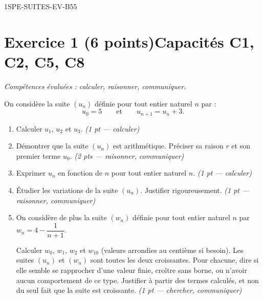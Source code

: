 
\begin{evaluation}{1SPE-SUITES-EV-B}{55}

\section*{Exercice 1 \ifnxVersionProfesseur\hfill (6 points)\fi \hfill Capacités C1, C2, C5, C8}

\textit{Compétences évaluées : calculer, raisonner, communiquer.}

\medskip
On considère la suite $(u_n)$ définie pour tout entier naturel $n$ par :
\[
  u_0 = 5 \qquad \text{et} \qquad u_{n+1} = u_n + 3.
\]

\begin{enumerate}
  \item Calculer $u_1$, $u_2$ et $u_3$.
  \ifnxVersionProfesseur\hfill\textit{(1 pt — calculer)}\fi

  \item Démontrer que la suite $(u_n)$ est arithmétique. Préciser sa raison $r$ et son premier terme $u_0$.
  \ifnxVersionProfesseur\hfill\textit{(2 pts — raisonner, communiquer)}\fi

  \item Exprimer $u_n$ en fonction de $n$ pour tout entier naturel $n$.
  \ifnxVersionProfesseur\hfill\textit{(1 pt — calculer)}\fi

  \item Étudier les variations de la suite $(u_n)$. Justifier rigoureusement.
  \ifnxVersionProfesseur\hfill\textit{(1 pt — raisonner, communiquer)}\fi

  \item On considère de plus la suite $(w_n)$ définie pour tout entier naturel $n$ par
    $w_n = 4 - \dfrac{1}{n+1}$.

    Calculer $w_0$, $w_1$, $w_2$ et $w_{10}$ (valeurs arrondies au centième si besoin).
    Les suites $(u_n)$ et $(w_n)$ sont toutes les deux croissantes. Pour chacune,
    dire si elle semble se rapprocher d'une valeur finie, croître sans borne, ou
    n'avoir aucun comportement de ce type. Justifier à partir des termes calculés,
    et non du seul fait que la suite est croissante.
  \ifnxVersionProfesseur\hfill\textit{(1 pt — chercher, communiquer)}\fi
\end{enumerate}


\end{evaluation}
